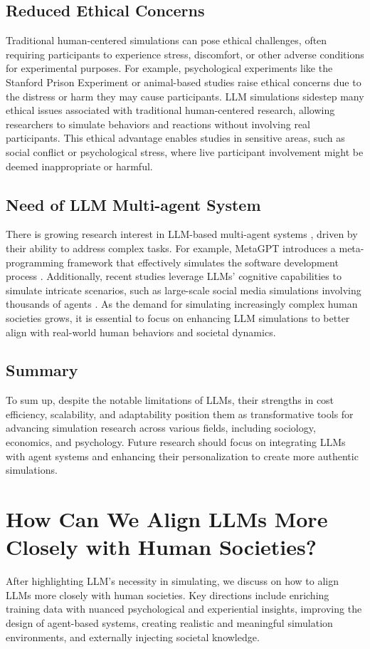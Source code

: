 \subsection{Reduced Ethical Concerns}
Traditional human-centered simulations can pose ethical challenges, often requiring participants to experience stress, discomfort, or other adverse conditions for experimental purposes. For example, psychological experiments like the Stanford Prison Experiment \citep{zimbardo1971stanford} or animal-based studies raise ethical concerns due to the distress or harm they may cause participants. LLM simulations sidestep many ethical issues associated with traditional human-centered research, allowing researchers to simulate behaviors and reactions without involving real participants. This ethical advantage enables studies in sensitive areas, such as social conflict or psychological stress, where live participant involvement might be deemed inappropriate or harmful.

\subsection{Need of LLM Multi-agent System}
There is growing research interest in LLM-based multi-agent systems \citep{wu2023autogen, chen2023agentverse, hong2023metagpt}, driven by their ability to address complex tasks. For example, MetaGPT introduces a meta-programming framework that effectively simulates the software development process \citep{hong2023metagpt}. Additionally, recent studies leverage LLMs’ cognitive capabilities to simulate intricate scenarios, such as large-scale social media simulations involving thousands of agents \citep{guo2024large}. As the demand for simulating increasingly complex human societies grows, it is essential to focus on enhancing LLM simulations to better align with real-world human behaviors and societal dynamics.

\subsection{Summary}
To sum up, despite the notable limitations of LLMs, their strengths in cost efficiency, scalability, and adaptability position them as transformative tools for advancing simulation research across various fields, including sociology, economics, and psychology. Future research should focus on integrating LLMs with agent systems and enhancing their personalization to create more authentic simulations.

\section{How Can We Align LLMs More Closely with Human Societies?}
After highlighting LLM's necessity in simulating, we discuss on how to align LLMs more closely with human societies. Key directions include enriching training data with nuanced psychological and experiential insights, improving the design of agent-based systems, creating realistic and meaningful simulation environments, and externally injecting societal knowledge.

